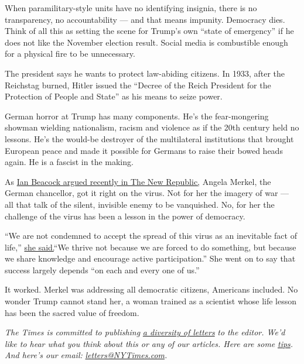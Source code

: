 When paramilitary-style units have no identifying insignia, there is no
transparency, no accountability --- and that means impunity. Democracy
dies. Think of all this as setting the scene for Trump's own ``state of
emergency'' if he does not like the November election result. Social
media is combustible enough for a physical fire to be unnecessary.

The president says he wants to protect law-abiding citizens. In 1933,
after the Reichstag burned, Hitler issued the ``Decree of the Reich
President for the Protection of People and State'' as his means to seize
power.

German horror at Trump has many components. He's the fear-mongering
showman wielding nationalism, racism and violence as if the 20th century
held no lessons. He's the would-be destroyer of the multilateral
institutions that brought European peace and made it possible for
Germans to raise their bowed heads again. He is a fascist in the making.

As
\href{https://www.google.com/url?q=https://newrepublic.com/article/157112/germany-gets-coronavirus\&sa=D\&ust=1595605994586000\&usg=AFQjCNH0rL7W7j6lrXzrAGOt2JzfuSTxVw}{Ian
Beacock argued recently in The New Republic,} Angela Merkel, the German
chancellor, got it right on the virus. Not for her the imagery of war
--- all that talk of the silent, invisible enemy to be vanquished. No,
for her the challenge of the virus has been a lesson in the power of
democracy.

``We are not condemned to accept the spread of this virus as an
inevitable fact of life,''
\href{https://www.bundeskanzlerin.de/bkin-en/news/statement-chancellor-1732302}{she
said.}``We thrive not because we are forced to do something, but because
we share knowledge and encourage active participation.'' She went on to
say that success largely depends ``on each and every one of us.''

It worked. Merkel was addressing all democratic citizens, Americans
included. No wonder Trump cannot stand her, a woman trained as a
scientist whose life lesson has been the sacred value of freedom.

\emph{The Times is committed to publishing}
\href{https://www.nytimes3xbfgragh.onion/2019/01/31/opinion/letters/letters-to-editor-new-york-times-women.html}{\emph{a
diversity of letters}} \emph{to the editor. We'd like to hear what you
think about this or any of our articles. Here are some}
\href{https://help.nytimes3xbfgragh.onion/hc/en-us/articles/115014925288-How-to-submit-a-letter-to-the-editor}{\emph{tips}}\emph{.
And here's our email:}
\href{mailto:letters@NYTimes.com}{\emph{letters@NYTimes.com}}\emph{.}

